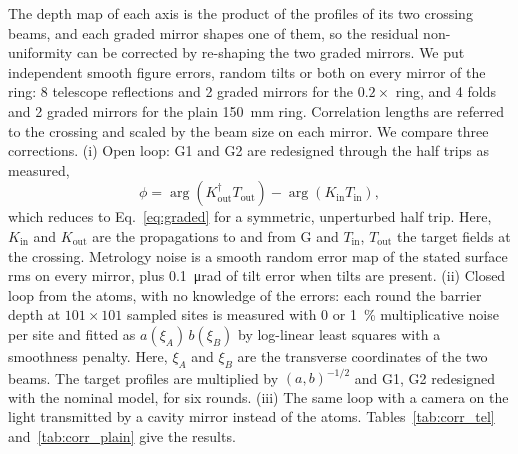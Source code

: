 \documentclass[11pt]{article}
\begin{document}
The depth map of each axis is the product of the profiles of its two crossing beams, and each graded
mirror shapes one of them, so the residual non-uniformity can be corrected by re-shaping the two
graded mirrors. We put independent smooth figure errors, random tilts or both on every mirror of the
ring: 8 telescope reflections and 2 graded mirrors for the $0.2\times$ ring, and 4 folds and 2 graded
mirrors for the plain \SI{150}{\milli\metre} ring. Correlation lengths are referred to the crossing and
scaled by the beam size on each mirror. We compare three corrections. (i) Open loop: G1 and G2 are
redesigned through the half trips as measured,
\begin{equation}
  \phi = \arg\!\left(K_\mathrm{out}^{\dagger} T_\mathrm{out}\right) - \arg\!\left(K_\mathrm{in} T_\mathrm{in}\right),
  \label{eq:redesign}
\end{equation}
which reduces to Eq.~\eqref{eq:graded} for a symmetric, unperturbed half trip. Here, $K_\mathrm{in}$
and $K_\mathrm{out}$ are the propagations to and from G and $T_\mathrm{in}$, $T_\mathrm{out}$ the
target fields at the crossing. Metrology noise is a smooth random error map of the stated surface rms
on every mirror, plus \SI{0.1}{\micro\radian} of tilt error when tilts are present. (ii) Closed loop
from the atoms, with no knowledge of the errors: each round the barrier depth at $101\times101$
sampled sites is measured with 0 or \SI{1}{\percent} multiplicative noise per site and fitted as
$a(\xi_A)\,b(\xi_B)$ by log-linear least squares with a smoothness penalty. Here, $\xi_A$ and $\xi_B$
are the transverse coordinates of the two beams. The target profiles are multiplied by
$(a,b)^{-1/2}$ and G1, G2 redesigned with the nominal model, for six rounds. (iii) The same loop with
a camera on the light transmitted by a cavity mirror instead of the atoms. Tables~\ref{tab:corr_tel}
and~\ref{tab:corr_plain} give the results.

\begin{table}[htbp]
\centering
\caption{Telescope ring, $0.2\times$: depth rms over the $10^{6}$-site array; two random realisations
where shown, separated by a slash. Camera loop: \SI{10}{\micro\metre} pixels, 48 bins.
Generated by \texttt{scripts/cavity\_report\_tables.py}.}
\label{tab:corr_tel}
{\setlength{\tabcolsep}{2.5pt}}
\end{table}

\begin{table}[htbp]
\centering
\caption{Plain ring with plane folds, $p = \SI{150}{\milli\metre}$, as Table~\ref{tab:corr_tel}.}
\label{tab:corr_plain}

\end{table}
\end{document}
